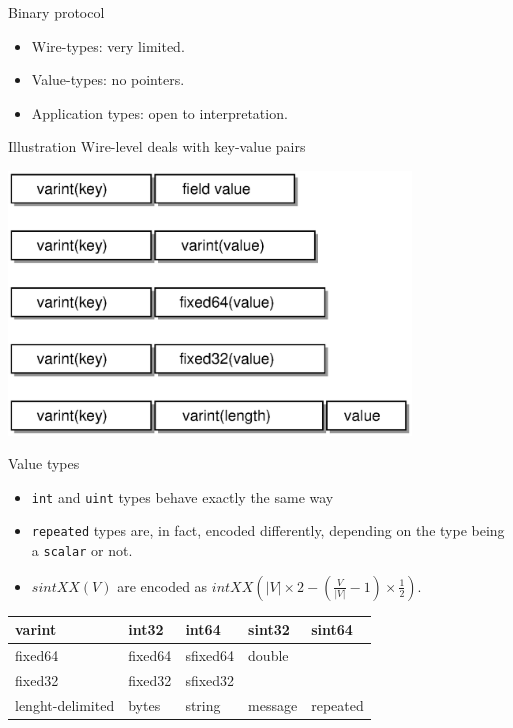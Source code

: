 \documentclass[presentation]{beamer}
\begin{document}
\begin{frame}[label={sec:org4a4b75a}]{Binary protocol}
\begin{itemize}
\item Wire-types: very limited.
\item Value-types: no pointers.
\item Application types: open to interpretation.
\end{itemize}
\end{frame}

\begin{frame}[label={sec:org2439b35}]{Illustration}
Wire-level deals with key-value pairs
\begin{center}
\includegraphics[height=7cm]{./images/wire-types.eps}
\end{center}
\end{frame}

\begin{frame}[fragile,label={sec:orgcff3785}]{Value types}
 \begin{itemize}
\item \texttt{int} and \texttt{uint} types behave exactly the same way
\item \texttt{repeated} types are, in fact, encoded differently, depending
on the type being a \texttt{scalar} or not.
\item \(sintXX(V)\) are encoded as
\(intXX(|V| \times 2 - (\frac{V}{|V|} - 1) \times \frac{1}{2})\).
\end{itemize}

\begin{center}
\begin{tabular}{lllll}
varint & int32 & int64 & sint32 & sint64\\
\hline
fixed64 & fixed64 & sfixed64 & double & \\
\hline
fixed32 & fixed32 & sfixed32 &  & \\
\hline
lenght-delimited & bytes & string & message & repeated\\
\end{tabular}
\end{center}
\end{frame}
\end{document}
